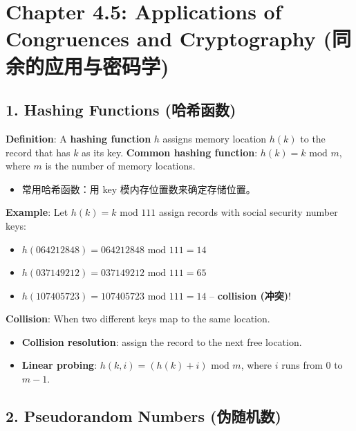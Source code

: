 \documentclass[10pt,a4paper,openany]{ctexbook}
\theoremstyle{definition}
\theoremstyle{remark}
\begin{document}
\section{Chapter 4.5: Applications of Congruences and Cryptography (同余的应用与密码学)}

\vspace{-2pt}

\subsection{1. Hashing Functions (哈希函数)}

\textbf{Definition}: A \textbf{hashing function} $h$ assigns memory location $h(k)$ to the record that has $k$ as its key.
\textbf{Common hashing function}: $h(k) = k \text{ mod } m$, where $m$ is the number of memory locations.
\begin{itemize}
\item 常用哈希函数：用 key 模内存位置数来确定存储位置。

\end{itemize}

\textbf{Example}: Let $h(k) = k \text{ mod } 111$ assign records with social security number keys:
\begin{itemize}
\item $h(064212848) = 064212848 \text{ mod } 111 = 14$
\item $h(037149212) = 037149212 \text{ mod } 111 = 65$
\item $h(107405723) = 107405723 \text{ mod } 111 = 14$ -- \textbf{collision (冲突)}!

\end{itemize}

\textbf{Collision}: When two different keys map to the same location.
\begin{itemize}
\item \textbf{Collision resolution}: assign the record to the next free location.
\item \textbf{Linear probing}: $h(k, i) = (h(k) + i) \text{ mod } m$, where $i$ runs from $0$ to $m-1$.

\end{itemize}

\vspace{-2pt}

\subsection{2. Pseudorandom Numbers (伪随机数)}
\end{document}
